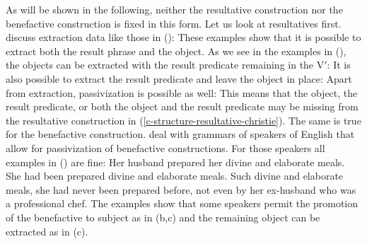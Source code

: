 As will be shown in the following, neither the resultative construction nor the benefactive
construction is fixed in this form. Let us look at resultatives first. \citet[]{CR92a} discuss
extraction data like those in ():
\eal\label{ex-resultative-just-verb-remains}
\zl
These examples show that it is possible to extract both the result phrase and the object. As we see
in the examples in (), the objects can be extracted with the result predicate remaining in the V$'$:
\eal
{}
\zl
It is also possible to extract the result predicate and leave the object in place:
\eal
{}
\zl
Apart from extraction, passivization is possible as well:
\eal
{}
\zl
This means that the object, the result predicate, or both the object and the result predicate may be missing from the
resultative construction in (\ref{c-structure-resultative-christie}). The same is true for the
benefactive construction. \citet{AGT2014a} deal with grammars of speakers of English that allow for
passivization of benefactive constructions. For those speakers all examples in () are fine:
\eal
\label{ex-prepare-benefactive}
\ex Her husband prepared her divine and elaborate meals.
\ex
\label{ex-she-had-been-prepared-a-meal} 
She had been prepared divine and elaborate meals.
\ex
\label{ex-benefactive-just-verb} 
Such divine and elaborate meals, she had never been prepared before, not even
by her ex-husband who was a professional chef.
\zl
The examples show that some speakers permit the promotion of the benefactive to subject as in
(b,c) and the remaining object can be extracted as in (c). 



